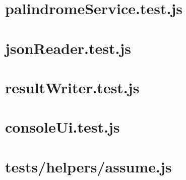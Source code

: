 \section*{palindromeService.test.js}


\section*{jsonReader.test.js}


\section*{resultWriter.test.js}


\section*{consoleUi.test.js}


\section*{tests/helpers/assume.js}

